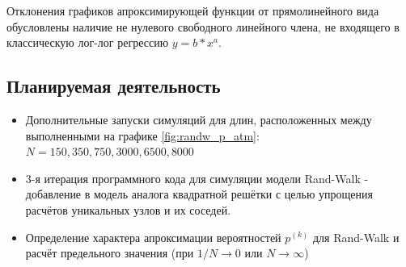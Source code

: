 Отклонения графиков апроксимирующей функции от прямолинейного вида обусловлены наличие не нулевого свободного линейного члена, не входящего в классическую лог-лог регрессию $y = b * x^a$.

\subsection{Планируемая деятельность}

\begin{itemize}
\item Дополнительные запуски симуляций для длин, расположенных между выполненными на графике \ref{fig:randw_p_atm}: $N=150, 350, 750, 3000, 6500, 8000$
\item 3-я итерация программного кода для симуляции модели Rand-Walk - добавление в модель аналога квадратной решётки с целью упрощения расчётов уникальных узлов и их соседей.
\item  Определение характера апроксимации вероятностей $p^{(k)}$ для Rand-Walk и расчёт предельного значения (при $1/N \to 0$ или $N \to \infty$)
\end{itemize}


